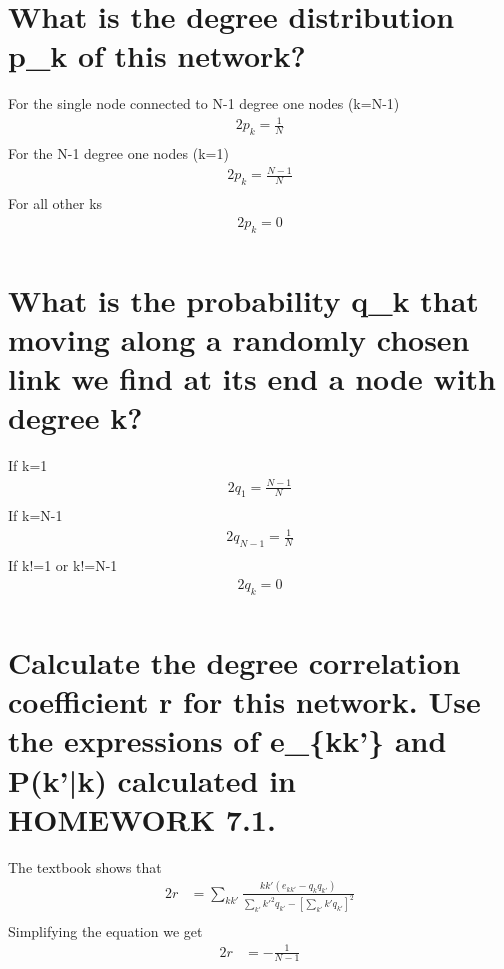 \documentclass{article}%
\begin{document}
%
\normalsize%
\section{What is the degree distribution p\_k of this network?}%
\label{sec:Whatisthedegreedistributionpkofthisnetwork?}%
For the single node connected to N{-}1 degree one nodes (k=N{-}1)%
\begin{alignat*}{2}%
p_k=\frac{1}{N}\\%
\end{alignat*}%
For the N{-}1 degree one nodes (k=1)%
\begin{alignat*}{2}%
p_k=\frac{N-1}{N}\\%
\end{alignat*}%
For all other ks%
\begin{alignat*}{2}%
p_k=0\\%
\end{alignat*}

%
\section{What is the probability q\_k that moving along a randomly chosen link we find at its end a node with degree k?}%
\label{sec:Whatistheprobabilityqkthatmovingalongarandomlychosenlinkwefindatitsendanodewithdegreek?}%
If k=1%
\begin{alignat*}{2}%
q_1=\frac{N-1}{N}\\%
\end{alignat*}%
If k=N{-}1%
\begin{alignat*}{2}%
q_{N-1}=\frac{1}{N}\\%
\end{alignat*}%
If k!=1 or k!=N{-}1%
\begin{alignat*}{2}%
q_k=0\\%
\end{alignat*}

%
\section{Calculate the degree correlation coefficient r for this network. Use the expressions of e\_\{kk'\} and P(k'|k) calculated in HOMEWORK 7.1.}%
\label{sec:Calculatethedegreecorrelationcoefficientrforthisnetwork.UsetheexpressionsofekkandP(k|k)calculatedinHOMEWORK7.1.}%
The textbook shows that%
\begin{alignat*}{2}%
r&=\sum_{kk'}\frac{kk'(e_{kk'}-q_kq_{k'})}{\sum_{k'}k'^2q_{k'}-[\sum_{k'}k'q_{k'}]^2}\\%
\end{alignat*}%
Simplifying the equation we get%
\begin{alignat*}{2}%
r&=-\frac{1}{N-1}\\%
\end{alignat*}
\end{document}

